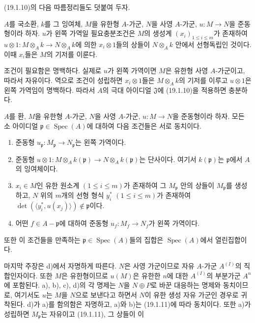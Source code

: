 (19.1.10)의 다음 따름정리들도 덧붙여 두자.

\begin{corollary}[19.1.11]
\label{0.19.1.11-fr}
$A$를 국소환, $k$를 그 잉여체, $M$을 유한형 $A$-가군,
$N$을 사영 $A$-가군, $u:M\to N$을 준동형이라 하자. $u$가 왼쪽
가역일 필요충분조건은 $M$의 생성계 $(x_i)_{1\leq i\leq m}$가
존재하여 $u\otimes1:M\otimes_Ak\to N\otimes_Ak$에 의한
$x_i\otimes1$들의 상들이 $N\otimes_Ak$ 안에서 선형독립인 것이다.
이때 $x_i$들은 $M$의 기저를 이룬다.
\end{corollary}

조건이 필요함은 명백하다. 실제로 $u$가 왼쪽 가역이면 $M$은
유한형 사영 $A$-가군이고, 따라서 자유이다. 역으로 조건이 성립하면
$x_i\otimes1$들은 $M\otimes_Ak$의 기저를 이루고
$u\otimes1$은 왼쪽 가역임이 명백하다. 따라서 $A$의 극대 아이디얼
$\mathfrak J$에 (19.1.10)을 적용하면 충분하다.

\begin{corollary}[19.1.12]
\label{0.19.1.12-fr}
$A$를 환, $M$을 유한형 $A$-가군, $N$을 사영 $A$-가군,
$u:M\to N$을 준동형이라 하자. 모든 소 아이디얼
$\mathfrak p\in\operatorname{Spec}(A)$에 대하여 다음 조건들은 서로
동치이다.
\begin{enumerate}
  \item[a)] 준동형
  $u_{\mathfrak p}:M_{\mathfrak p}\to N_{\mathfrak p}$는 왼쪽
  가역이다.
  \item[b)] 준동형
  $u\otimes1:M\otimes_Ak(\mathfrak p)\to
  N\otimes_Ak(\mathfrak p)$는 단사이다. 여기서
  $k(\mathfrak p)$는 $\mathfrak p$에서 $A$의 잉여체이다.
  \item[c)] $x_i\in M$인 유한 원소계 $(1\leq i\leq m)$가 존재하여
  그 $M_{\mathfrak p}$ 안의 상들이 $M_{\mathfrak p}$를 생성하고,
  $N$ 위의 $m$개의 선형 형식 $y_i^*$ $(1\leq i\leq m)$가 존재하여
  $\det(\langle y_i^*,u(x_j)\rangle)\notin\mathfrak p$이다.
  \item[d)] 어떤 $f\in A-\mathfrak p$에 대하여 준동형
  $u_f:M_f\to N_f$가 왼쪽 가역이다.
\end{enumerate}
또한 이 조건들을 만족하는 $\mathfrak p\in\operatorname{Spec}(A)$들의
집합은 $\operatorname{Spec}(A)$에서 열린집합이다.
\end{corollary}

마지막 주장은 d)에서 자명하게 따른다. $N$은 사영 가군이므로 자유
$A$-가군 $A^{(I)}$의 직합인자이다. 또한 $M$은 유한형이므로
$u(M)$은 유한한 $n$에 대한 $A^{(I)}$의 부분가군 $A^n$에 포함된다.
a), b), c), d)의 각 명제는 $N$을 $N\oplus P$로 바꾼 대응하는
명제와 동치이므로, 여기서도 $u$는 $M$을 $N$으로 보낸다고 하면서
$N$이 유한 생성 자유 가군인 경우로 귀착된다. d)가 a)를 함의함은
자명하고, a)와 b)는 (19.1.11)에 따라 동치이다. 또한 a)가 성립하면
$M_{\mathfrak p}$는 자유이고 (19.1.11), 그 상들이 이

